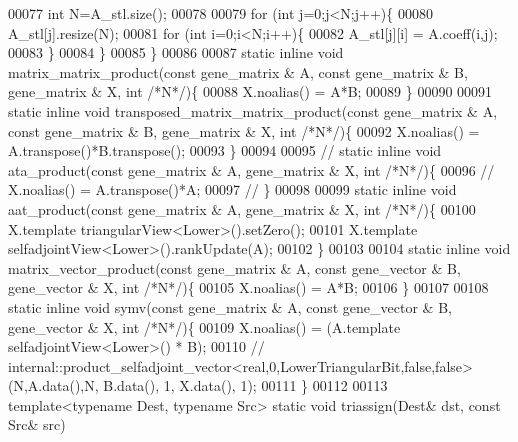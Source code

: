 \begin{DoxyCode}
00077     \textcolor{keywordtype}{int}  N=A\_stl.size();
00078 
00079     \textcolor{keywordflow}{for} (\textcolor{keywordtype}{int} j=0;j<N;j++)\{
00080       A\_stl[j].resize(N);
00081       \textcolor{keywordflow}{for} (\textcolor{keywordtype}{int} i=0;i<N;i++)\{
00082         A\_stl[j][i] = A.coeff(i,j);
00083       \}
00084     \}
00085   \}
00086 
00087   \textcolor{keyword}{static} \textcolor{keyword}{inline} \textcolor{keywordtype}{void} matrix\_matrix\_product(\textcolor{keyword}{const} gene\_matrix & A, \textcolor{keyword}{const} gene\_matrix & B, gene\_matrix & X, \textcolor{keywordtype}{
      int}  \textcolor{comment}{/*N*/})\{
00088     X.noalias() = A*B;
00089   \}
00090 
00091   \textcolor{keyword}{static} \textcolor{keyword}{inline} \textcolor{keywordtype}{void} transposed\_matrix\_matrix\_product(\textcolor{keyword}{const} gene\_matrix & A, \textcolor{keyword}{const} gene\_matrix & B, 
      gene\_matrix & X, \textcolor{keywordtype}{int}  \textcolor{comment}{/*N*/})\{
00092     X.noalias() = A.transpose()*B.transpose();
00093   \}
00094 
00095 \textcolor{comment}{//   static inline void ata\_product(const gene\_matrix & A, gene\_matrix & X, int  /*N*/)\{}
00096 \textcolor{comment}{//     X.noalias() = A.transpose()*A;}
00097 \textcolor{comment}{//   \}}
00098 
00099   \textcolor{keyword}{static} \textcolor{keyword}{inline} \textcolor{keywordtype}{void} aat\_product(\textcolor{keyword}{const} gene\_matrix & A, gene\_matrix & X, \textcolor{keywordtype}{int}  \textcolor{comment}{/*N*/})\{
00100     X.template triangularView<Lower>().setZero();
00101     X.template selfadjointView<Lower>().rankUpdate(A);
00102   \}
00103 
00104   \textcolor{keyword}{static} \textcolor{keyword}{inline} \textcolor{keywordtype}{void} matrix\_vector\_product(\textcolor{keyword}{const} gene\_matrix & A, \textcolor{keyword}{const} gene\_vector & B, gene\_vector & X, \textcolor{keywordtype}{
      int}  \textcolor{comment}{/*N*/})\{
00105     X.noalias() = A*B;
00106   \}
00107 
00108   \textcolor{keyword}{static} \textcolor{keyword}{inline} \textcolor{keywordtype}{void} symv(\textcolor{keyword}{const} gene\_matrix & A, \textcolor{keyword}{const} gene\_vector & B, gene\_vector & X, \textcolor{keywordtype}{int}  \textcolor{comment}{/*N*/})\{
00109     X.noalias() = (A.template selfadjointView<Lower>() * B);
00110 \textcolor{comment}{//     internal::product\_selfadjoint\_vector<real,0,LowerTriangularBit,false,false>(N,A.data(),N, B.data(),
       1, X.data(), 1);}
00111   \}
00112 
00113   \textcolor{keyword}{template}<\textcolor{keyword}{typename} Dest, \textcolor{keyword}{typename} Src> \textcolor{keyword}{static} \textcolor{keywordtype}{void} triassign(Dest& dst, \textcolor{keyword}{const} Src& src)

\end{DoxyCode}
